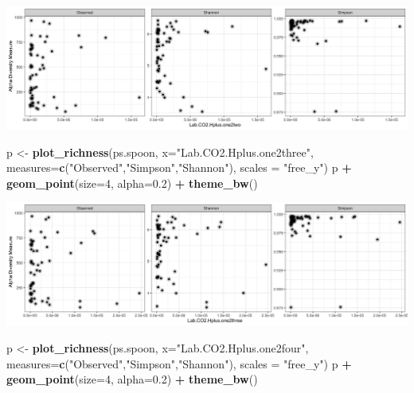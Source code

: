 \documentclass[]{article}
\newenvironment{Shaded}{\begin{snugshade}}{\end{snugshade}}
\newcommand{\DataTypeTok}[1]{\textcolor[rgb]{0.13,0.29,0.53}{#1}}
\newcommand{\DecValTok}[1]{\textcolor[rgb]{0.00,0.00,0.81}{#1}}
\newcommand{\FloatTok}[1]{\textcolor[rgb]{0.00,0.00,0.81}{#1}}
\newcommand{\KeywordTok}[1]{\textcolor[rgb]{0.13,0.29,0.53}{\textbf{#1}}}
\newcommand{\NormalTok}[1]{#1}
\newcommand{\OperatorTok}[1]{\textcolor[rgb]{0.81,0.36,0.00}{\textbf{#1}}}
\newcommand{\StringTok}[1]{\textcolor[rgb]{0.31,0.60,0.02}{#1}}
\begin{document}
\includegraphics{output-rmd/richness-ph-Lab.CO2.Hplus.one2two.spoon-1.png}

\begin{Shaded}
\begin{Highlighting}[]
\NormalTok{p <-}\StringTok{ }\KeywordTok{plot_richness}\NormalTok{(ps.spoon, }\DataTypeTok{x=}\StringTok{"Lab.CO2.Hplus.one2three"}\NormalTok{, }\DataTypeTok{measures=}\KeywordTok{c}\NormalTok{(}\StringTok{"Observed"}\NormalTok{,}\StringTok{"Simpson"}\NormalTok{,}\StringTok{"Shannon"}\NormalTok{), }\DataTypeTok{scales =} \StringTok{"free_y"}\NormalTok{)}
\NormalTok{p }\OperatorTok{+}\StringTok{ }\KeywordTok{geom_point}\NormalTok{(}\DataTypeTok{size=}\DecValTok{4}\NormalTok{, }\DataTypeTok{alpha=}\FloatTok{0.2}\NormalTok{) }\OperatorTok{+}\StringTok{ }\KeywordTok{theme_bw}\NormalTok{()}
\end{Highlighting}
\end{Shaded}

\includegraphics{output-rmd/richness-ph-Lab.CO2.Hplus.one2three.spoon-1.png}

\begin{Shaded}
\begin{Highlighting}[]
\NormalTok{p <-}\StringTok{ }\KeywordTok{plot_richness}\NormalTok{(ps.spoon, }\DataTypeTok{x=}\StringTok{"Lab.CO2.Hplus.one2four"}\NormalTok{, }\DataTypeTok{measures=}\KeywordTok{c}\NormalTok{(}\StringTok{"Observed"}\NormalTok{,}\StringTok{"Simpson"}\NormalTok{,}\StringTok{"Shannon"}\NormalTok{), }\DataTypeTok{scales =} \StringTok{"free_y"}\NormalTok{)}
\NormalTok{p }\OperatorTok{+}\StringTok{ }\KeywordTok{geom_point}\NormalTok{(}\DataTypeTok{size=}\DecValTok{4}\NormalTok{, }\DataTypeTok{alpha=}\FloatTok{0.2}\NormalTok{) }\OperatorTok{+}\StringTok{ }\KeywordTok{theme_bw}\NormalTok{()}
\end{Highlighting}
\end{Shaded}
\end{document}
